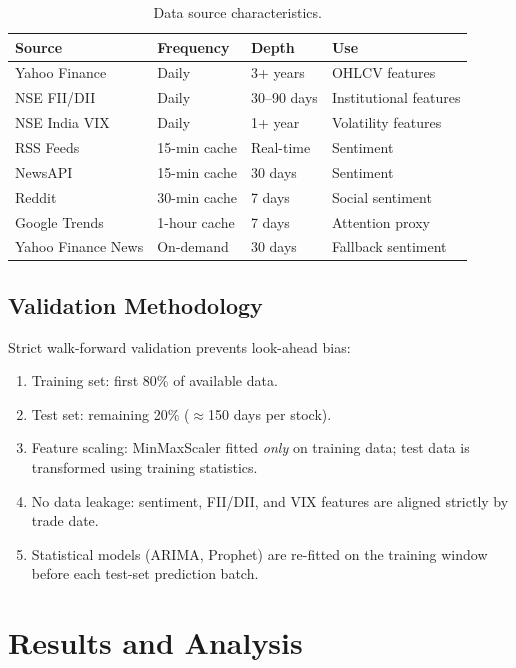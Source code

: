 \documentclass[10pt,a4paper,twoside]{article}
\begin{document}
\begin{table}[htb]
  \begin{center}
    {\caption{Data source characteristics.}\label{tab:datasources}}
    \begin{tabular}{|l|l|l|l|}
    \hline
    \textbf{Source} & \textbf{Frequency} & \textbf{Depth} & \textbf{Use} \\
    \hline
    Yahoo Finance & Daily & 3+ years & OHLCV features \\
    NSE FII/DII & Daily & 30--90 days & Institutional features \\
    NSE India VIX & Daily & 1+ year & Volatility features \\
    RSS Feeds & 15-min cache & Real-time & Sentiment \\
    NewsAPI & 15-min cache & 30 days & Sentiment \\
    Reddit & 30-min cache & 7 days & Social sentiment \\
    Google Trends & 1-hour cache & 7 days & Attention proxy \\
    Yahoo Finance News & On-demand & 30 days & Fallback sentiment \\
    \hline
    \end{tabular}
  \end{center}
\end{table}

\subsection{Validation Methodology}

Strict walk-forward validation prevents look-ahead bias:
\begin{enumerate}
\item Training set: first 80\% of available data.
\item Test set: remaining 20\% ($\approx$150 days per stock).
\item Feature scaling: MinMaxScaler fitted \emph{only} on training data; test
  data is transformed using training statistics.
\item No data leakage: sentiment, FII/DII, and VIX features are aligned
  strictly by trade date.
\item Statistical models (ARIMA, Prophet) are re-fitted on the training window
  before each test-set prediction batch.
\end{enumerate}

\section{Results and Analysis}
\label{sec:results}
\end{document}
